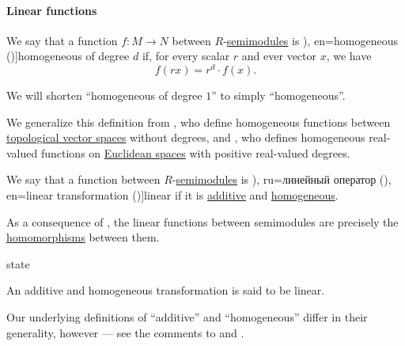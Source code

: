 \paragraph{Linear functions}

\begin{definition}\label{def:homogeneous_function}\mimprovised
  We say that a function \( f: M \to N \) between \( R \)-\hyperref[def:semimodule]{semimodules} is \term[ru=однородная (\cite[416]{Зорич2019АнализЧасть1}), en=homogeneous (\cite[def. 2.3.1]{HillePhillips1996FunctionalAnalysis})]{homogeneous} of degree \( d \) if, for every scalar \( r \) and ever vector \( x \), we have
  \begin{equation}\label{eq:def:homogeneous_function}
    f(rx) = r^d \cdot f(x).
  \end{equation}

  We will shorten \enquote{homogeneous of degree \( 1 \)} to simply \enquote{homogeneous}.
\end{definition}
\begin{comments}
  \item We generalize this definition from , who define homogeneous functions between \hyperref[def:topological_vector_space]{topological vector spaces} without degrees, and , who defines homogeneous real-valued functions on \hyperref[def:euclidean_space]{Euclidean spaces} with positive real-valued degrees.
\end{comments}

\begin{definition}\label{def:linear_function}\mimprovised
  We say that a function between \( R \)-\hyperref[def:semimodule]{semimodules} is \term[bg=линейно преобразувание (\cite[101]{Обрешков1962ВисшаАлгебра}), ru=линейный оператор (\cite[236]{Тыртышников2007ЛинейнаяАлгебра}), en=linear transformation (\cite[def. 2.3.2]{HillePhillips1996FunctionalAnalysis})]{linear} if it is \hyperref[def:additive_function]{additive} and \hyperref[def:homogeneous_function]{homogeneous}.
\end{definition}
\begin{comments}
  \item As a consequence of , the linear functions between semimodules are precisely the \hyperref[def:semimodule/homomorphism]{homomorphisms} between them.

  \item {} state
  \begin{displayquote}
    An additive and homogeneous transformation is said to be linear.
  \end{displayquote}

  Our underlying definitions of \enquote{additive} and \enquote{homogeneous} differ in their generality, however --- see the comments to  and .
\end{comments}

